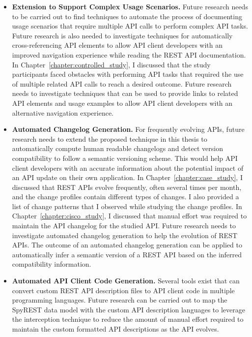 \documentclass[12pt]{ucalgthes1}
\begin{document}
\begin{itemize}
  \item \textbf{Extension to Support Complex Usage Scenarios.} Future research needs to be carried out to find techniques to automate the process of documenting usage scenarios that require multiple API calls to perform complex API tasks. Future research is also needed to investigate techniques for automatically cross-referencing API elements to allow API client developers with an improved navigation experience while reading the REST API documentation. In Chapter~\ref{chapter:controlled_study}, I discussed that the study participants faced obstacles with performing API tasks that required the use of multiple related API calls to reach a desired outcome. Future research needs to investigate techniques that can be used to provide links to related API elements and usage examples to allow API client developers with an alternative navigation experience.
  \item \textbf{Automated Changelog Generation.} For frequently evolving APIs, future research needs to extend the proposed technique in this thesis to automatically compute human readable changelogs and detect version compatibility to follow a semantic versioning scheme. This would help API client developers with an accurate information about the potential impact of an API update on their own application. In Chapter~\ref{chapter:case_study}, I discussed that REST APIs evolve frequently, often several times per month, and the change profiles contain different types of changes. I also provided a list of change patterns that I observed while studying the change profiles. In Chapter~\ref{chapter:cisco_study}, I discussed that manual effort was required to maintain the API changelog for the studied API. Future research needs to investigate automated changelog generation to help the evolution of REST APIs. The outcome of an automated changelog generation can be applied to automatically infer a semantic version of a REST API based on the inferred compatibility information.
  \item \textbf{Automated API Client Code Generation.} Several tools exist that can convert custom REST API description files to API client code in multiple programming languages. Future research can be carried out to map the SpyREST data model with the custom API description languages to leverage the interception technique to reduce the amount of manual effort required to maintain the custom formatted API descriptions as the API evolves.

\end{itemize}
\end{document}
